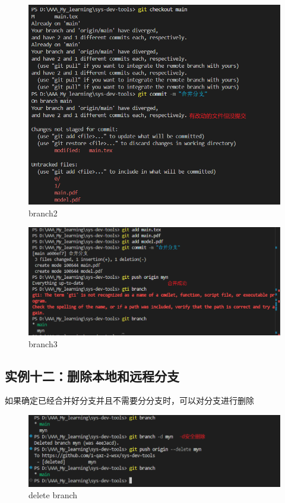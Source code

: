 \documentclass[a4paper]{article}
\begin{document}
    \begin{figure}[H]
    \centering
    \includegraphics[width=1\textwidth]{images/branch2.png}
    \caption{branch2}
    \end{figure}

    \begin{figure}[H]
    \centering
    \includegraphics[width=1\textwidth]{images/branch3.png}
    \caption{branch3}
    \end{figure}    
\subsection{实例十二：删除本地和远程分支}
如果确定已经合并好分支并且不需要分分支时，可以对分支进行删除
    \begin{figure}[H]
    \centering
    \includegraphics[width=1\textwidth]{images/dBranch.png}
    \caption{delete branch}
    \end{figure}
\end{document}
